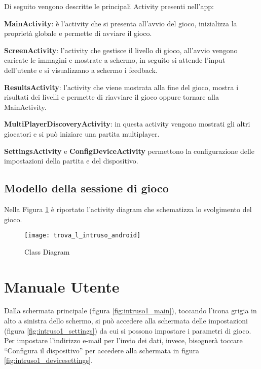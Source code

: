 \noindent Di seguito vengono descritte le principali Activity presenti nell'app:

\begin{description}
\item \textbf{MainActivity}: \`{e} l'activity che si presenta all'avvio del gioco, inizializza la propriet\`{a} globale  e permette di avviare il gioco.
\item \textbf{ScreenActivity}: l'activity che gestisce il livello di gioco, all'avvio vengono caricate le immagini e mostrate a schermo, in seguito si attende l'input dell'utente e si visualizzano a schermo i feedback.
\item \textbf{ResultsActivity}: l'activity che viene mostrata alla fine del gioco, mostra i risultati dei livelli e permette di riavviare il gioco oppure tornare alla MainActivity.
\item \textbf{MultiPlayerDiscoveryActivity}: in questa activity vengono mostrati gli altri giocatori e si pu\`{o} iniziare una partita multiplayer.
\item \textbf{SettingsActivity} e \textbf{ConfigDeviceActivity} permettono la configurazione delle impostazioni della partita e del dispositivo.
\end{description}

\subsection{Modello della sessione di gioco}

\noindent
Nella Figura \ref{fig:activity_diagram} \`{e} riportato l'activity diagram che schematizza lo svolgimento del gioco.

\begin{figure}
	\centering
    \texttt{[image: trova\_l\_intruso\_android]}
	\caption{Class Diagram}
	\label{fig:activity_diagram}
\end{figure}





\section{Manuale Utente}
Dalla schermata principale (figura \ref{fig:intruso1_main}), toccando l'icona grigia in alto a sinistra dello schermo, si può accedere alla schermata delle impostazioni (figura \ref{fig:intruso1_settings}) da cui si possono impostare i parametri di gioco. Per impostare l'indirizzo e-mail per l'invio dei dati, invece, bisognerà toccare ``Configura il dispositivo'' per accedere alla schermata in figura \ref{fig:intruso1_devicesettings}.

